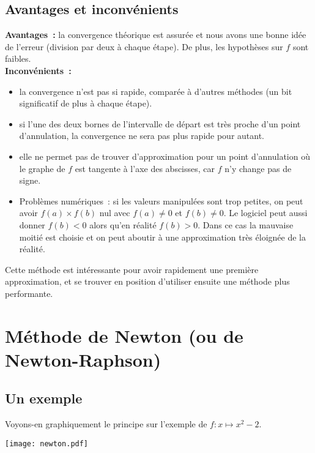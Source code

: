 \subsection{Avantages et inconvénients}

\textbf{Avantages~:} la convergence théorique est assurée et nous avons une bonne idée de l'erreur (division 
par deux à chaque étape). De plus, les hypothèses sur $f$ sont faibles.\\

\textbf{Inconvénients~:}
\begin{itemize}
\item la convergence n'est pas si rapide, comparée à d'autres méthodes (un bit significatif de 
plus à chaque étape).
\item si l'une des deux bornes de l'intervalle de départ est très proche d'un point d'annulation, 
la convergence ne sera pas plus rapide pour autant.
\item elle ne permet pas de trouver d'approximation pour un point d'annulation où le graphe de $f$ 
est tangente à l'axe des abscisses, car $f$ n'y change pas de signe.
\item Problèmes numériques~: si les valeurs manipulées sont trop petites, on peut avoir
$f(a)\times f(b)$ nul avec $f(a)\neq 0$ et $f(b)\neq 0$. Le logiciel peut aussi donner $f(b)<0$ 
alors qu'en réalité $f(b)>0$. Dans ce cas la mauvaise moitié est choisie et on peut aboutir à une 
approximation très éloignée de la réalité.
\end{itemize}

Cette méthode est intéressante pour avoir rapidement une première approximation, et se trouver en 
position d'utiliser ensuite une méthode plus performante.

\section{Méthode de Newton (ou de Newton-Raphson)}

\subsection{Un exemple}
Voyons-en graphiquement  le principe sur l'exemple de $f:x\mapsto x^{2} -2$.

\begin{center}
 \texttt{[image: newton.pdf]}
\end{center}

